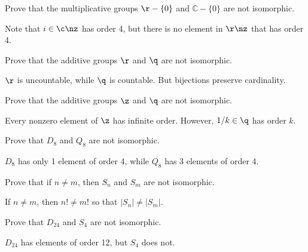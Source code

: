 \begin{exercise}\label{ex1.6.4}
    Prove that the multiplicative groups $\r - \{0\}$ and $\mathbb{C} - \{0\}$ are not isomorphic.
\end{exercise}

\begin{sol}
    Note that $i \in \c \nz$ has order 4, but there is no element in $\r \nz$ that has order 4.
\end{sol}

\begin{exercise}\label{ex1.6.5}
    Prove that the additive groups $\r$ and $\q$ are not isomorphic.
\end{exercise}

\begin{sol}
    $\r$ is uncountable, while $\q$ is countable. But bijections preserve cardinality.
\end{sol}

\begin{exercise}\label{ex1.6.6}
    Prove that the additive groups $\z$ and $\q$ are not isomorphic.
\end{exercise}

\begin{sol}
    Every nonzero element of $\z$ has infinite order. However, $1/k \in \q$ has order $k$.
\end{sol}

\begin{exercise}\label{ex1.6.7}
    Prove that $D_8$ and $Q_8$ are not isomorphic.
\end{exercise}

\begin{sol}
    $D_8$ has only 1 element of order 4, while $Q_8$ has 3 elements of order 4.
\end{sol}

\begin{exercise}\label{ex1.6.8}
    Prove that if $n \neq m$, then $S_n$ and $S_m$ are not isomorphic.
\end{exercise}

\begin{sol}
    If $n \neq m$, then $n! \neq m!$ so that $|S_n| \neq |S_m|$.
\end{sol}

\begin{exercise}\label{ex1.6.9}
    Prove that $D_{24}$ and $S_4$ are not isomorphic.
\end{exercise}

\begin{sol}
    $D_{24}$ has elements of order 12, but $S_4$ does not.
\end{sol}

